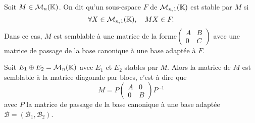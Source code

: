 \documentclass[a4paper]{book}
\begin{document}
\begin{Definition}[Stable] Soit $M\in \mathcal{M}_{n}(\mathbb{K})$. On dit qu'un sous-espace $F$ de $\mathcal{M}_{n,1}(\mathbb{K})$ est stable par $M$ si
$$\forall X\in \mathcal{M}_{n,1}(\mathbb{K}),\quad MX \in F.$$
Dans ce cas, $M$ est semblable à une matrice de la forme$\begin{pmatrix}
A & B \\ 0 & C\end{pmatrix}$ avec une matrice de passage de la base canonique à une base adaptée à $F$. 
\end{Definition}
\begin{Proposition} Soit $E_1\oplus     E_2=\mathcal{M}_{n}(\mathbb{K})$ avec $E_1$ et $E_2$ stables par $M$. Alors la matrice de $M$ est semblable à la matrice diagonale par blocs, c'est à dire que 
$$M=P \begin{pmatrix}
A & 0 \\ 0 & B
\end{pmatrix}P^{-1}$$ avec $P$ la matrice de passage de la base canonique à une base adaptée $\mathcal{B}=(\mathcal{B}_1,\mathcal{B}_2)$.
\end{Proposition}
\end{document}
